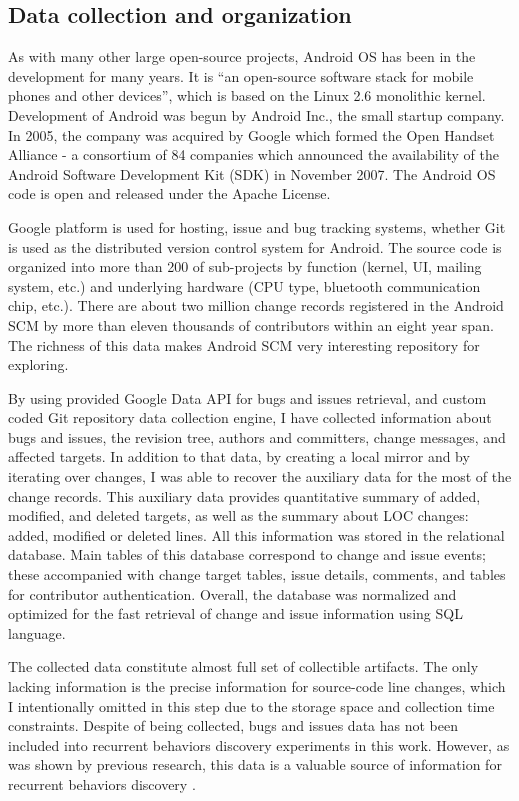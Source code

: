 \documentclass[conference]{worldcomp}
\begin{document}
\subsection{Data collection and organization}
As with many other large open-source projects, Android OS has been in the development for many years. 
It is ``an open-source software stack for mobile phones and other 
devices'', which is based on the Linux 2.6 monolithic kernel.
Development of Android was begun by Android Inc., the small startup company.
In 2005, the company was acquired by Google which formed the Open Handset Alliance - a consortium of 84 companies 
which announced the availability of the Android Software Development Kit (SDK) 
in November 2007. The Android OS code is open and released under the Apache License.

Google platform is used for hosting, issue and bug tracking systems, whether Git is used 
as the distributed version control system for Android. The source code is organized 
into more than 200 of sub-projects by function (kernel, UI, mailing system, etc.) 
and underlying hardware (CPU type, bluetooth communication chip, etc.). 
There are about two million change records registered in the Android SCM by more than 
eleven thousands of contributors within an eight year span. The richness of this data 
makes Android SCM very interesting repository for exploring.

By using provided Google Data API for bugs and issues retrieval, and custom coded
Git repository data collection engine, I have collected information about bugs and issues,
the revision tree, authors and committers, change messages, and affected targets. 
In addition to that data, by creating a local mirror and by iterating over changes, I was able 
to recover the auxiliary data for the most of the change records. This auxiliary data provides quantitative
summary of added, modified, and deleted targets, as well as the summary about LOC changes: 
added, modified or deleted lines. All this information 
was stored in the relational database. Main tables of this database correspond to change 
and issue events; these accompanied with change target tables, issue details, comments, and 
tables for contributor authentication. Overall, the database was normalized and optimized 
for the fast retrieval of change and issue information using SQL language.

The collected data constitute almost full set of collectible artifacts. 
The only lacking information is the precise information for source-code line changes, which I 
intentionally omitted in this step due to the storage space and collection time constraints. 
Despite of being collected, bugs and issues data has not been included into recurrent 
behaviors discovery experiments in this work. However, as was shown by previous research, 
this data is a valuable source of information for recurrent behaviors discovery \cite{citeulike:10392277}.
\end{document}
